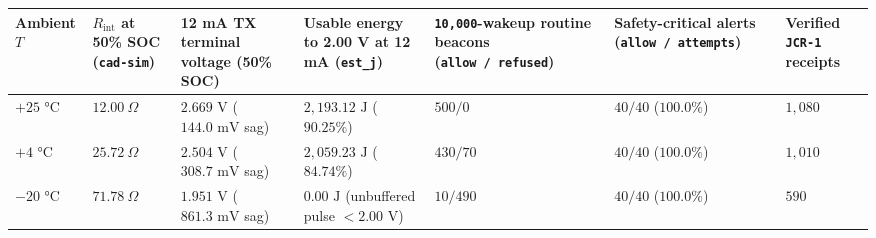 \documentclass[10pt,letterpaper]{article}
\newcounter{none}
\begin{document}
{\def\LTcaptype{none} %
{\scriptsize\setlength{\tabcolsep}{3.0pt}\renewcommand{\arraystretch}{1.14}
\begin{longtable}[]{@{}
  >{\raggedright\arraybackslash}p{}
  >{\raggedright\arraybackslash}p{}
  >{\raggedright\arraybackslash}p{}
  >{\raggedright\arraybackslash}p{}
  >{\raggedright\arraybackslash}p{}
  >{\raggedright\arraybackslash}p{}
  >{\raggedright\arraybackslash}p{}@{}}
\toprule\noalign{}
\begin{minipage}[b]{\linewidth}\raggedright
\textbf{Ambient \(T\)}
\end{minipage} & \begin{minipage}[b]{\linewidth}\raggedright
\textbf{\(R_{\text{int}}\) at 50\% SOC (\texttt{cad-sim})}
\end{minipage} & \begin{minipage}[b]{\linewidth}\raggedright
\textbf{12 mA TX terminal voltage (50\% SOC)}
\end{minipage} & \begin{minipage}[b]{\linewidth}\raggedright
\textbf{Usable energy to 2.00 V at 12 mA (\texttt{est\_j})}
\end{minipage} & \begin{minipage}[b]{\linewidth}\raggedright
\textbf{\texttt{10,000}-wakeup routine beacons
(\texttt{allow\ /\allowbreak{}\ refused})}
\end{minipage} & \begin{minipage}[b]{\linewidth}\raggedright
\textbf{Safety-critical alerts (\texttt{allow\ /\allowbreak{}\ attempts})}
\end{minipage} & \begin{minipage}[b]{\linewidth}\raggedright
\textbf{Verified \texttt{JCR-1} receipts}
\end{minipage} \\
\midrule\noalign{}
\endhead
\bottomrule\noalign{}
\endlastfoot
\(+25\text{ °C}\) & \(12.00\ \Omega\) & \(2.669\text{ V}\)
(\(144.0\text{ mV}\) sag) & \(2{,}193.12\text{ J}\) (\(90.25\%\)) &
\(500 / 0\) & \(40 / 40\) (\(100.0\%\)) & \(1{,}080\) \\
\(+4\text{ °C}\) & \(25.72\ \Omega\) & \(2.504\text{ V}\)
(\(308.7\text{ mV}\) sag) & \(2{,}059.23\text{ J}\) (\(84.74\%\)) &
\(430 / 70\) & \(40 / 40\) (\(100.0\%\)) & \(1{,}010\) \\
\(-20\text{ °C}\) & \(71.78\ \Omega\) & \(1.951\text{ V}\)
(\(861.3\text{ mV}\) sag) & \(0.00\text{ J}\) (unbuffered pulse
\(< 2.00\text{ V}\)) & \(10 / 490\) & \(40 / 40\) (\(100.0\%\)) &
\(590\) \\
\end{longtable}
}
}
\end{document}
